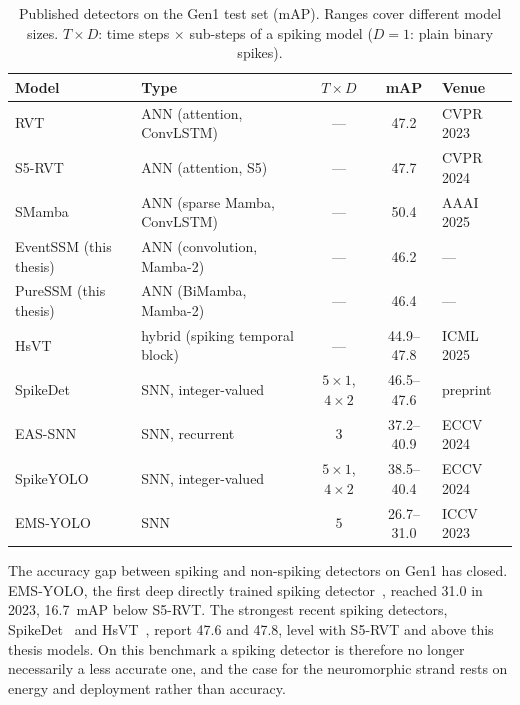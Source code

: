 \documentclass[11pt, a4paper]{report}
\begin{document}
\begin{table}[htbp]
\centering
\small
\caption[Spiking and non-spiking detectors on Gen1]{Published detectors on the Gen1 test set (mAP). Ranges cover different model sizes. $T\times D$: time steps
    $\times$ sub-steps of a spiking model ($D=1$: plain binary spikes).}
\label{tab:snn_landscape}
\begin{tabularx}{\textwidth}{@{}l>{\raggedright\arraybackslash}Xccl@{}}
\toprule
\textbf{Model} & \textbf{Type} & \textbf{$T\times D$} & \textbf{mAP} & \textbf{Venue} \\
\midrule
RVT \cite{gehrig2023recurrent}        & ANN (attention, ConvLSTM) & --- & 47.2 & CVPR 2023 \\
S5-RVT \cite{zubic2024state}          & ANN (attention, S5)       & --- & 47.7 & CVPR 2024 \\
SMamba \cite{yang2025smamba}          & ANN (sparse Mamba, ConvLSTM) & --- & 50.4 & AAAI 2025 \\
EventSSM (this thesis)                  & ANN (convolution, Mamba-2) & --- & 46.2 & --- \\
PureSSM (this thesis)                   & ANN (BiMamba, Mamba-2)    & --- & 46.4 & --- \\
\midrule
HsVT \cite{xu2025hybrid}              & hybrid (spiking temporal block) & --- & 44.9--47.8 & ICML 2025 \\
SpikeDet \cite{fan2025spikedet}       & SNN, integer-valued       & $5\times1$, $4\times2$ & 46.5--47.6 & preprint \\
EAS-SNN \cite{wang2024eas}            & SNN, recurrent            & $3$ & 37.2--40.9 & ECCV 2024 \\
SpikeYOLO \cite{luo2024integer}       & SNN, integer-valued       & $5\times1$, $4\times2$ & 38.5--40.4 & ECCV 2024 \\
EMS-YOLO \cite{su2023deep}            & SNN                       & $5$ & 26.7--31.0 & ICCV 2023 \\
\bottomrule
\end{tabularx}
\end{table}

The accuracy gap between spiking and non-spiking detectors on Gen1 has
closed. EMS-YOLO, the first deep directly trained spiking detector~\cite{su2023deep}, reached 31.0 in 2023,
16.7~mAP below S5-RVT. The strongest recent spiking detectors, SpikeDet~\cite{fan2025spikedet} and
HsVT~\cite{xu2025hybrid}, report 47.6 and 47.8, level with S5-RVT and above this thesis models.
On this benchmark a spiking detector is therefore no longer necessarily a less accurate one, and the case
for the neuromorphic strand rests on energy and deployment rather than accuracy.
\end{document}
